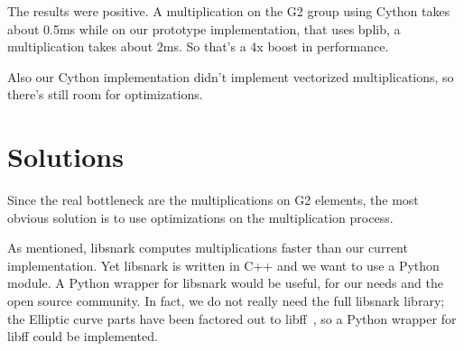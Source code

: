\documentclass{article}
\begin{document}
The results were positive. A multiplication on the G2 group using Cython
takes about 0.5ms while on our prototype implementation, that uses bplib,
a multiplication takes about 2ms. So that's a 4x boost in performance.

Also our Cython implementation didn't implement vectorized multiplications,
so there's still room for optimizations.


\section{Solutions}

Since the real bottleneck are the multiplications on G2 elements,
the most obvious solution is to use optimizations on the multiplication
process.

As mentioned, libsnark computes multiplications faster than our
current implementation. Yet libsnark is written in C++ and we want to
use a Python module. A Python wrapper for libsnark would be useful,
for our needs and the open source community. In fact, we do not really
need the full libsnark library; the Elliptic curve parts have been
factored out to libff~\cite{libff}, so a Python wrapper for libff
could be implemented. 




\end{document}
